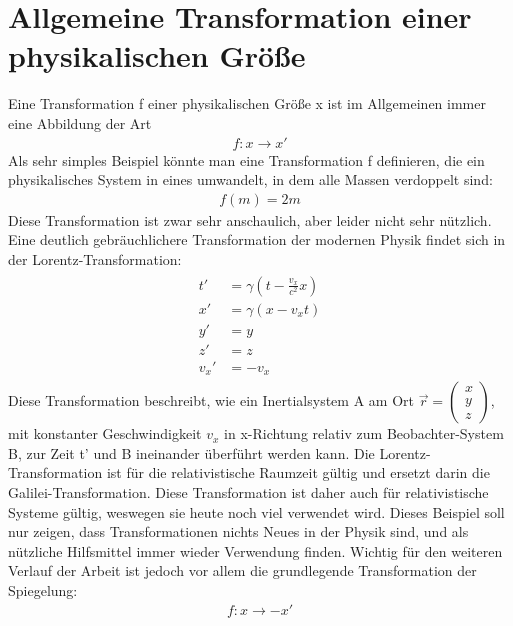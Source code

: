 \documentclass[12pt,a4paper]{scrartcl}
\numberwithin{equation}{section}
\begin{document}
  \newpage  %

  \section{Allgemeine Transformation einer physikalischen Größe}

Eine Transformation f einer physikalischen Größe x ist im Allgemeinen immer eine Abbildung der Art
\begin{align}
    f: x \to x'
\end{align}
Als sehr simples Beispiel könnte man eine Transformation f definieren, die ein physikalisches System in eines umwandelt, in dem alle Massen verdoppelt sind:
\begin{align}
    f(m) = 2m
\end{align}
Diese Transformation ist zwar sehr anschaulich, aber leider nicht sehr nützlich. Eine deutlich gebräuchlichere Transformation der modernen Physik findet sich in der Lorentz-Transformation:
\begin{align}
  \begin{split}
    t' &= \gamma(t - \frac{v_x}{c^2}x) \\ x' &= \gamma(x -v_x t) \\ y' &= y \\ z' &= z \\ v_x' &= -v_x
  \end{split}
\end{align}
Diese Transformation beschreibt, wie ein Inertialsystem A am Ort $ \vec{r} = \begin{pmatrix}x\\y\\z\end{pmatrix} $, mit konstanter Geschwindigkeit $v_x$ in x-Richtung relativ zum Beobachter-System B, zur Zeit t' und B ineinander überführt werden kann. Die Lorentz-Transformation ist für die relativistische Raumzeit gültig und ersetzt darin die Galilei-Transformation. Diese Transformation ist daher auch für relativistische Systeme gültig, weswegen sie heute noch viel verwendet wird. Dieses Beispiel soll nur zeigen, dass Transformationen nichts Neues in der Physik sind, und als nützliche Hilfsmittel immer wieder Verwendung finden.
Wichtig für den weiteren Verlauf der Arbeit ist jedoch vor allem die grundlegende Transformation der Spiegelung:
\begin{align}
    f: x \to - x'
\end{align}
\end{document}
